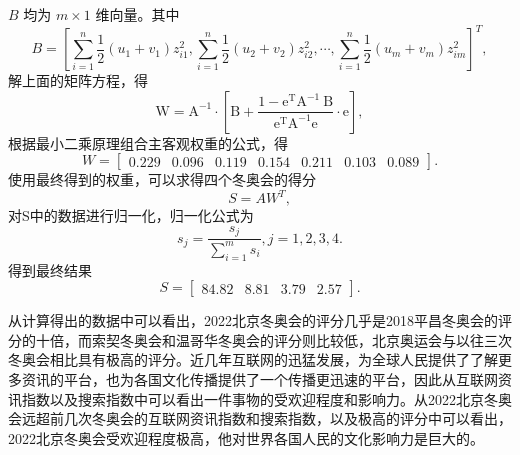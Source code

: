 \documentclass[withoutpreface,bwprint]{cumcmthesis} %
\begin{document}
$ B$  均为 $ m \times 1 $ 维向量。其中$$B=\left[\sum_{i=1}^{n} \frac{1}{2}\left(u_{1}+v_{1}\right) z_{i 1}^{2}, \sum_{i=1}^{n} \frac{1}{2}\left(u_{2}+v_{2}\right) z_{i 2}^{2}, \cdots, \sum_{i=1}^{n} \frac{1}{2}\left(u_{m}+v_{m}\right) z_{i m}^{2}\right]^{T},$$
解上面的矩阵方程，得
$$\mathrm{W}=\mathrm{A}^{-1} \cdot\left[\mathrm{B}+\frac{1-\mathrm{e}^{\mathrm{T}} \mathrm{A}^{-1}\mathrm{~B}}{\mathrm{e}^{\mathrm{T}} \mathrm{A}^{-1} \mathrm{e}} \cdot \mathrm{e}\right],$$
根据最小二乘原理组合主客观权重的公式，得
$$W=\left[\begin{array}{lllllll}
0.229 & 0.096 & 0.119 & 0.154 & 0.211 & 0.103 & 0.089
\end{array}\right]
.$$
使用最终得到的权重，可以求得四个冬奥会的得分
$$S=AW^T,$$
对S中的数据进行归一化，归一化公式为$$s_{j}=\frac{s_{j}}{\sum_{i=1}^{m} s_i},j=1,2,3,4.$$
得到最终结果$$S=\left[\begin{array}{llll}
84.82 & 8.81 & 3.79 & 2.57
\end{array}\right]
.$$

从计算得出的数据中可以看出，2022北京冬奥会的评分几乎是2018平昌冬奥会的评分的十倍，而索契冬奥会和温哥华冬奥会的评分则比较低，北京奥运会与以往三次冬奥会相比具有极高的评分。近几年互联网的迅猛发展，为全球人民提供了了解更多资讯的平台，也为各国文化传播提供了一个传播更迅速的平台，因此从互联网资讯指数以及搜索指数中可以看出一件事物的受欢迎程度和影响力。从2022北京冬奥会远超前几次冬奥会的互联网资讯指数和搜索指数，以及极高的评分中可以看出，2022北京冬奥会受欢迎程度极高，他对世界各国人民的文化影响力是巨大的。
\end{document}
